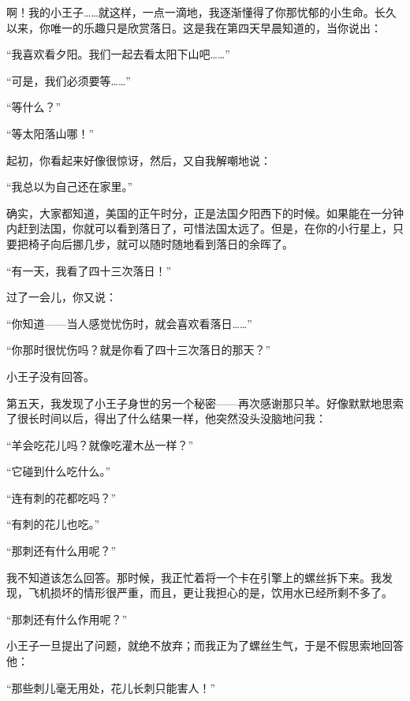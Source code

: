 \starttitle[title={6}]

啊！我的小王子\ldots{}\ldots{}就这样，一点一滴地，我逐渐懂得了你那忧郁的小生命。长久以来，你唯一的乐趣只是欣赏落日。这是我在第四天早晨知道的，当你说出：

“我喜欢看夕阳。我们一起去看太阳下山吧\ldots{}\ldots{}”

“可是，我们必须要等\ldots{}\ldots{}”

“等什么？”

“等太阳落山哪！”

起初，你看起来好像很惊讶，然后，又自我解嘲地说：

“我总以为自己还在家里。”

确实，大家都知道，美国的正午时分，正是法国夕阳西下的时候。如果能在一分钟内赶到法国，你就可以看到落日了，可惜法国太远了。但是，在你的小行星上，只要把椅子向后挪几步，就可以随时随地看到落日的余晖了。

“有一天，我看了四十三次落日！”

过了一会儿，你又说：

“你知道------当人感觉忧伤时，就会喜欢看落日\ldots{}\ldots{}”

“你那时很忧伤吗？就是你看了四十三次落日的那天？”

小王子没有回答。

{\startalignment[center]
 \stopalignment}


\stoptitle

\starttitle[title={7}]

第五天，我发现了小王子身世的另一个秘密------再次感谢那只羊。好像默默地思索了很长时间以后，得出了什么结果一样，他突然没头没脑地问我：

“羊会吃花儿吗？就像吃灌木丛一样？”

“它碰到什么吃什么。”

“连有刺的花都吃吗？”

“有刺的花儿也吃。”

“那刺还有什么用呢？”

我不知道该怎么回答。那时候，我正忙着将一个卡在引擎上的螺丝拆下来。我发现，飞机损坏的情形很严重，而且，更让我担心的是，饮用水已经所剩不多了。

“那刺还有什么作用呢？”

小王子一旦提出了问题，就绝不放弃；而我正为了螺丝生气，于是不假思索地回答他：

“那些刺儿毫无用处，花儿长刺只能害人！”

